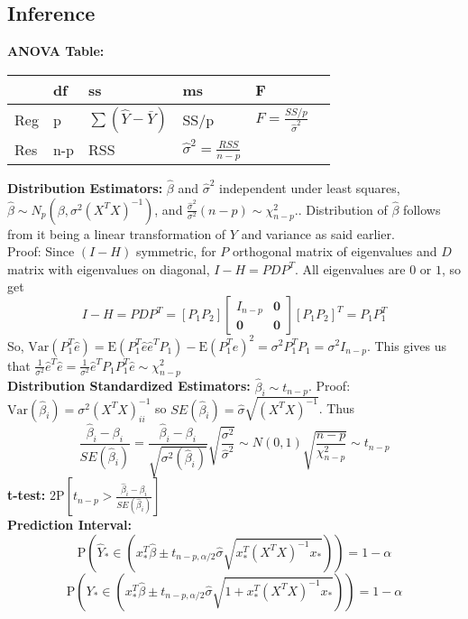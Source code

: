 \documentclass[10pt]{article}
\newcommand{\E}{\mathrm{E}}
\newcommand{\var}{\mathrm{Var}}
\theoremstyle{definition}
\begin{document}
\begin{multicols}{2}
\subsection{Inference} 
{\bf ANOVA Table:}\\
\begin{tabular}{l | l l l l l}
        & df      & ss                       & ms       & F     \\
    \hline
    Reg & p       & $\sum(\hat Y - \bar Y)$  & SS/p                    & $F = \frac{SS/p}{\hat\sigma^2}$ \\
    Res & n-p     & RSS                      & $\hat\sigma^2= \frac{RSS}{n-p}$   &  
\end{tabular}

{\bf Distribution Estimators:} $\hat\beta$ and $\hat\sigma^2$ independent under least squares, \(\hat\beta \sim N_p(\beta,\sigma^2(X^TX)^{-1})\), and \(\frac{\hat\sigma^2}{\sigma^2}(n-p) \sim \chi_{n-p}^2.\). Distribution of $\hat\beta$ follows from it being a linear transformation of $Y$ and variance as said earlier. \\
Proof: Since $(I-H)$ symmetric, for $P$ orthogonal matrix of eigenvalues and $D$ matrix with eigenvalues on diagonal, \(I-H=PDP^T\). All eigenvalues are $0$ or $1$, so get
\[I-H=PDP^T=[P_1 P_2] \left[\begin{array}{cc} I_{n-p} & \mathbf{0}\\\mathbf{0} & \mathbf{0}\end{array} \right][P_1 P_2]^T = P_1 P_1^T\]
So, \(\var(P_1^T\hat e) = \E(P_1^T\hat e \hat e^T P_1) - \E(P_1^T \hat e)^2 = \sigma^2P_1^TP_1 = \sigma^2 I_{n-p}\). This gives us that \(\frac{1}{\sigma^2}\hat e^T \hat e = \frac{1}{\sigma^2}\hat e^T P_1 P_1^T \hat e \sim \chi_{n-p}^2\) \\
{\bf Distribution Standardized Estimators:} \(\hat\beta_i \sim t_{n-p}\). Proof: \(\var(\hat\beta_i) = \sigma^2(X^TX)^{-1}_{ii}\) so \(SE(\hat\beta_i)=\hat\sigma\sqrt{(X^TX)^{-1}}\). Thus 
\[\frac{\hat\beta_i - \beta_i}{SE(\hat\beta_i)} = \frac{\hat\beta_i - \beta_i}{\sqrt{\sigma^2(\hat\beta_i)}}\sqrt{\frac{\sigma^2}{\hat\sigma^2}} \sim N(0,1)\sqrt{\frac{n-p}{\chi_{n-p}^2}} \sim t_{n-p} \]
{\bf t-test:} \(2\mathrm{P}[t_{n-p}> \frac{\hat\beta_i - \beta_i}{SE(\hat\beta_i)}]\) \\
{\bf Prediction Interval:} 
\[\mathrm{P}\left(\hat Y_* \in (x_*^T\hat\beta \pm t_{n-p,\alpha/2}\hat\sigma\sqrt{x_*^T(X^TX)^{-1}x_*})\right)=1-\alpha\]
\[\mathrm{P}\left(Y_* \in (x_*^T\hat\beta \pm t_{n-p,\alpha/2}\hat\sigma\sqrt{1+x_*^T(X^TX)^{-1}x_*})\right)=1-\alpha\]

\end{multicols}
\end{document}
